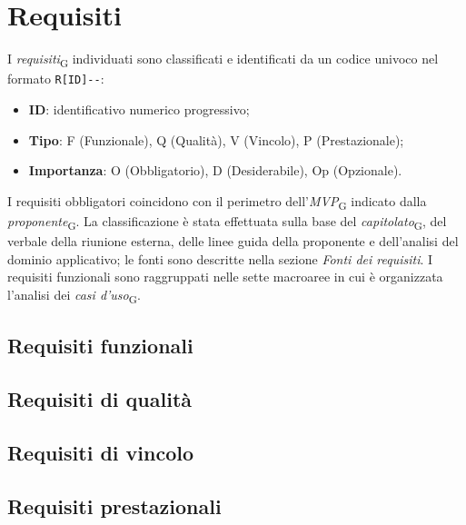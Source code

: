 \section{Requisiti}
I \textit{requisiti}\textsubscript{G} individuati sono classificati e identificati da un codice univoco nel formato \texttt{R[ID]-\allowbreak[Tipo]-\allowbreak[Importanza]}:
	\begin{itemize}
		\item \textbf{ID}: identificativo numerico progressivo;
		\item \textbf{Tipo}: F (Funzionale), Q (Qualità), V (Vincolo), P (Prestazionale);
		\item \textbf{Importanza}: O (Obbligatorio), D (Desiderabile), Op (Opzionale).
	\end{itemize}
I requisiti obbligatori coincidono con il perimetro dell'\textit{MVP}\textsubscript{G} indicato dalla \textit{proponente}\textsubscript{G}. La classificazione è stata effettuata sulla base del \textit{capitolato}\textsubscript{G}, del verbale della riunione esterna, delle linee guida della proponente e dell'analisi del dominio applicativo; le fonti sono descritte nella sezione \textit{Fonti dei requisiti}. I requisiti funzionali sono raggruppati nelle sette macroaree in cui è organizzata l'analisi dei \textit{casi d'uso}\textsubscript{G}.

\subsection{Requisiti funzionali}


\subsection{Requisiti di qualità}


\subsection{Requisiti di vincolo}


\subsection{Requisiti prestazionali}
